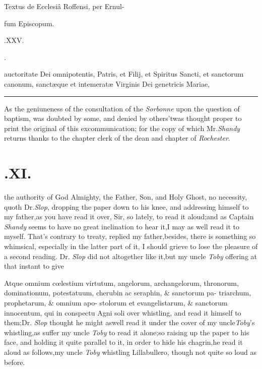 \documentclass{article}
\begin{document}
\centerline{Textus de Ecclesiâ Roffensi, per Ernul-}
\centerline{fum Episcopum.}
\bigskip
\bigskip
\centerline{\large{}.\quad XXV.}
\bigskip
\centerline{\large{}.}

 auctoritate Dei omnipotentis, Patris, et Filij, et Spiritus Sancti, et
sanctorum canonum, sanctæque et intemeratæ Virginis Dei genetricis Mariae,

\vfill
\bgroup\fontsize{8}{10}\selectfont
\hrule
As the geniuneness of the consultation of the \textit{Sorbonne} upon the question of
baptism, was doubted by some, and denied by others\tsh ’twas
thought proper to print the original of this excommunication; for the copy of
which Mr.\@ \textit{Shandy} returns thanks to the chapter clerk of the dean and
chapter of \textit{Rochester}.\par
\egroup
{}
\newpage
\def\alt#1#2{\hbox{\vbox to
3.6ex{\vss\openup-7pt\halign{##\cr\hss\tiny #2\hss\cr#1\cr}}}}
\def\c#1{\hbox to 0pt{\hss #1\hss}}
\section{.\quad  XI.}

the authority of God Almighty, the Father, Son, and Holy Ghost,
no necessity, quoth Dr.\@ \textit{Slop}, dropping the paper down to his knee, and
addressing himself to my father,\tsh as you have read it over, Sir, so lately, to
read it aloud;\tsk\break and as Captain \textit{Shandy} seems to have no great inclination
to hear it,\tsh I may as well read it to myself. That’s contrary to treaty, replied
my father,\tsk besides, there is something so whimsical, especially in the latter
part of it, I should grieve to lose the pleasure of a second reading.  Dr.\@
\textit{Slop} did not altogether like it,\tsh but my uncle \textit{Toby} offering at
that instant to give

\null\vfill
\quad\tsh Atque omnium cœlestium\break
virtutum, angelorum, archangelorum,\break
thronorum, dominationum, potestatuum,\break
cherubin ac seraphin, \& sanctorum pa-\break
triarchum, prophetarum, \& omnium apo-\break
stolorum et evangelistarum, \& sanctorum\break
innocentum, qui in conspectu Agni soli
over whistling, and read it himself to them;\tsh Dr.\@
\textit{Slop} thought he might as\break well read it under the cover
of my uncle\break \textit{Toby}’s whistling,\tsk as suffer my uncle
\textit{Toby} to read it alone;\tsh so raising up the paper to
his face, and holding it quite parallel to it, in order to hide
his chagrin,\tsk\break he read it aloud as follows,\tsh my uncle
\textit{Toby} whistling Lillabullero, though not quite so loud
as before.
\end{document}
